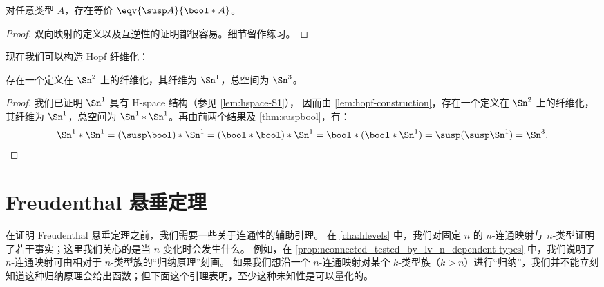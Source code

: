 \begin{lem}
  对任意类型 $A$，存在等价 $\eqv{\susp A}{\bool*A}$。
\end{lem}

\begin{proof}
  双向映射的定义以及互逆性的证明都很容易。细节留作练习。
\end{proof}

现在我们可以构造 Hopf 纤维化：

\begin{thm}
  存在一个定义在 $\Sn^2$ 上的纤维化，其纤维为 $\Sn^1$，总空间为 $\Sn^3$。
\end{thm}
\begin{proof}
  我们已证明 $\Sn^1$ 具有 H-space 结构（参见 \cref{lem:hspace-S1}），
  因而由 \cref{lem:hopf-construction}，存在一个定义在 $\Sn^2$ 上的纤维化，其纤维为 $\Sn^1$，总空间为 $\Sn^1*\Sn^1$。再由前两个结果及 \cref{thm:suspbool}，有：
  \begin{equation*}
    \Sn^1*\Sn^1 = (\susp\bool)*\Sn^1
    =(\bool*\bool)*\Sn^1
    =\bool*(\bool*\Sn^1)
    =\susp(\susp\Sn^1)
    =\Sn^3. \qedhere
  \end{equation*}
\end{proof}
\section{Freudenthal 悬垂定理}
\label{sec:freudenthal}

%
%

在证明 Freudenthal 悬垂定理之前，我们需要一些关于连通性的辅助引理。
在 \cref{cha:hlevels} 中，我们对固定 $n$ 的 $n$-连通映射与 $n$-类型证明了若干事实；这里我们关心的是当 $n$ 变化时会发生什么。
例如，在 \cref{prop:nconnected_tested_by_lv_n_dependent types} 中，我们说明了 $n$-连通映射可由相对于 $n$-类型族的“归纳原理”刻画。
如果我们想沿一个 $n$-连通映射对某个 $k$-类型族（$k> n$）进行“归纳”，我们并不能立刻知道这种归纳原理会给出函数；但下面这个引理表明，至少这种未知性是可以量化的。

